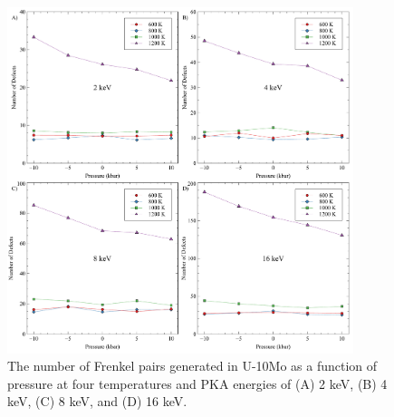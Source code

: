 \documentclass[review]{elsarticle}
\begin{document}
\begin{figure}[h!]
    \centering
    \includegraphics[width=0.9\textwidth]{rad_dam_P.pdf}
    \caption{The number of Frenkel pairs generated in U-10Mo as a function of pressure at four temperatures and PKA energies of (A) 2 keV, (B) 4 keV, (C) 8 keV, and (D) 16 keV.}
    \label{fig:rad_dam}
\end{figure}
\end{document}
